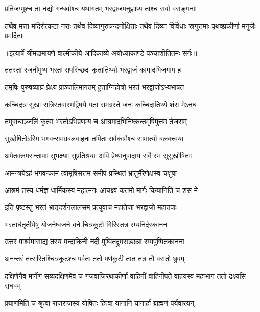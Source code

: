 \twolineshloka
{प्रतिजग्मुश्च ता नद्यो गन्धर्वाश्च यथागतम्}
{भरद्वाजमनुज्ञाप्य ताश्च सर्वा वराङ्गनाः} %

\fourlineindentedshloka
{तथैव मत्ता मदिरोत्कटा नराः}
{तथैव दिव्यागुरुचन्दनोक्षिताः}
{तथैव दिव्या विविधाः स्रगुत्तमाः}
{पृथक्प्रकीर्णा मनुजैः प्रमर्दिताः} %


{॥इत्यार्षे श्रीमद्रामायणे वाल्मीकीये आदिकाव्ये अयोध्याकाण्डे पञ्चाशीतितमः सर्गः॥}


\twolineshloka
{ततस्तां रजनीमुष्य भरतः सपरिच्छदः}
{कृतातिथ्यो भरद्वाजं कामादभिजगाम ह} %

\twolineshloka
{तमृषिः पुरुषव्याघ्रं प्रेक्ष्य प्राञ्जलिमागतम्}
{हुताग्निहोत्रो भरतं भरद्वाजोऽभ्यभाषत} %

\twolineshloka
{कच्चिदत्र सुखा रात्रिस्तवास्मद्विषये गता}
{समग्रस्ते जनः कच्चिदातिथ्ये शंस मेऽनघ} %

\twolineshloka
{तमुवाचाञ्जलिं कृत्वा भरतोऽभिप्रणम्य च}
{आश्रमादभिनिष्क्रन्तमृषिमुत्तम तेजसम्} %

\twolineshloka
{सुखोषितोऽस्मि भगवन्समग्रबलवाहनः}
{तर्पितः सर्वकामैश्च सामात्यो बलवत्त्वया} %

\twolineshloka
{अपेतक्लमसन्तापाः सुभक्ष्याः सुप्रतिश्रयाः}
{अपि प्रेष्यानुपादाय सर्वे स्म सुसुखोषिताः} %

\twolineshloka
{आमन्त्रयेऽहं भगवन्कामं त्वामृषिसत्तम}
{समीपं प्रस्थितं भ्रातुर्मैरेणेक्षस्व चक्षुषा} %

\twolineshloka
{आश्रमं तस्य धर्मज्ञ धार्मिकस्य महात्मनः}
{आचक्ष्व कतमो मार्गः कियानिति च शंस मे} %

\twolineshloka
{इति पृष्टस्तु भरतं भ्रातृदर्शनलालसम्}
{प्रत्युवाच महातेजा भरद्वाजो महातपाः} %

\twolineshloka
{भरतार्धतृतीयेषु योजनेष्वजने वने}
{चित्रकूटो गिरिस्तत्र रम्यनिर्दरकाननः} %

\twolineshloka
{उत्तरं पार्श्वमासाद्य तस्य मन्दाकिनी नदी}
{पुष्पितद्रुमसञ्छन्ना रम्यपुष्पितकानना} %

\twolineshloka
{अनन्तरं तत्सरितश्चित्रकूटश्च पर्वतः}
{ततो पर्णकुटी तात तत्र तौ वसतो ध्रुवम्} %

\threelineshloka
{दक्षिणेनैव मार्गेण सव्यदक्षिणमेव च}
{गजवाजिरथाकीर्णां वाहिनीं वाहिनीपते}
{वाहयस्व महाभाग ततो द्रक्ष्यसि राघवम्} %

\twolineshloka
{प्रयाणमिति च श्रुत्वा राजराजस्य योषितः}
{हित्वा यानानि यानार्हा ब्राह्मणं पर्यवारयन्} %

